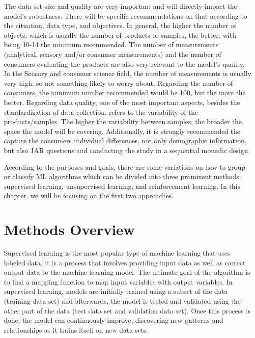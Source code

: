 \documentclass[
]{book}
\begin{document}
The data set size and quality are very important and will directly impact the model's robustness. There will be specific recommendations on that according to the situation, data type, and objectives. In general, the higher the number of objects, which is usually the number of products or samples, the better, with being 10-14 the minimum recommended. The number of measurements (analytical, sensory and/or consumer measurements) and the number of consumers evaluating the products are also very relevant to the model's quality. In the Sensory and consumer science field, the number of measurements is usually very high, so not something likely to worry about. Regarding the number of consumers, the minimum number recommended would be 100, but the more the better. Regarding data quality, one of the most important aspects, besides the standardization of data collection, refers to the variability of the products/samples. The higher the variability between samples, the broader the space the model will be covering. Additionally, it is strongly recommended the capture the consumers individual differences, not only demographic information, but also JAR questions and conducting the study in a sequential monadic design.

According to the purposes and goals, there are some variations on how to group or classify ML algorithms which can be divided into three prominent methods: supervised learning, unsupervised learning, and reinforcement learning. In this chapter, we will be focusing on the first two approaches.

\hypertarget{methods-overview}{%
\section{Methods Overview}\label{methods-overview}}

Supervised learning is the most popular type of machine learning that uses labeled data, it is a process that involves providing input data as well as correct output data to the machine learning model. The ultimate goal of the algorithm is to find a mapping function to map input variables with output variables. In supervised learning, models are initially trained using a subset of the data (training data set) and afterwards, the model is tested and validated using the other part of the data (test data set and validation data set). Once this process is done, the model can continuously improve, discovering new patterns and relationships as it trains itself on new data sets.
\end{document}
